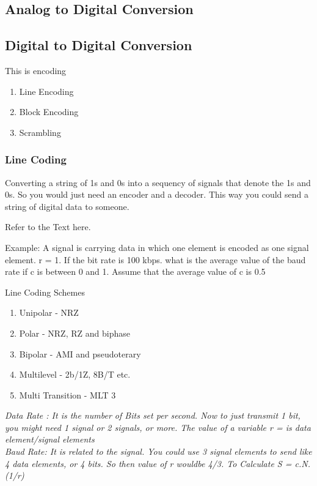 \documentclass[11pt]{article}
\begin{document}
\subsection{Analog to Digital Conversion}

\subsection{Digital to Digital Conversion}

This is encoding

\begin{enumerate}
	\item Line Encoding
 \item Block Encoding
 \item Scrambling
\end{enumerate}

\subsubsection{Line Coding}

Converting a string of 1s and 0s into a sequency of signals that denote the 1s and 0s. So you would just need an encoder and a decoder. This way you could send a string of digital data to someone.

Refer to the Text here. 

Example: A signal is carrying data in which one element is encoded as one signal element. r = 1. If the bit rate is 100 kbps. what is the average value of the baud rate if c is between 0 and 1. Assume that the average value of c is 0.5

Line Coding Schemes
\begin{enumerate}
	\item Unipolar - NRZ
	\item Polar - NRZ, RZ and biphase
	\item Bipolar - AMI and pseudoterary
	\item Multilevel - 2b/1Z, 8B/T etc. 
	\item Multi Transition - MLT 3
\end{enumerate}



\textit{Data Rate : It is the number of Bits set per second. Now to just transmit 1 bit, you might need 1 signal or 2 signals, or more. The value of a variable r =  is data element/signal elements}\\

\textit{Baud Rate: It is related to the signal. You could use 3 signal elements to send like 4 data elements, or 4 bits. So then value of r wouldbe 4/3. To Calculate S = c.N.(1/r)}\\
\end{document}
